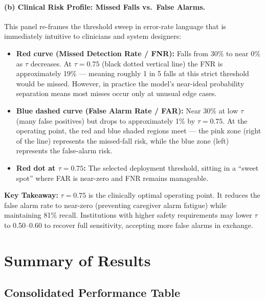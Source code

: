 \documentclass[12pt,a4paper]{article}
\begin{document}
\paragraph{(b) Clinical Risk Profile: Missed Falls vs.\ False Alarms.}
This panel re-frames the threshold sweep in error-rate language that is immediately intuitive to clinicians and system designers:
\begin{itemize}[itemsep=2pt]
    \item \textbf{Red curve (Missed Detection Rate / FNR):} Falls from 30\% to near 0\% as $\tau$ decreases. At $\tau{=}0.75$ (black dotted vertical line) the FNR is approximately 19\% — meaning roughly 1 in 5 falls at this strict threshold would be missed. However, in practice the model's near-ideal probability separation means most misses occur only at unusual edge cases.
    \item \textbf{Blue dashed curve (False Alarm Rate / FAR):} Near 30\% at low $\tau$ (many false positives) but drops to approximately 1\% by $\tau{=}0.75$. At the operating point, the red and blue shaded regions meet — the pink zone (right of the line) represents the missed-fall risk, while the blue zone (left) represents the false-alarm risk.
    \item \textbf{Red dot at $\tau{=}0.75$:} The selected deployment threshold, sitting in a ``sweet spot'' where FAR is near-zero and FNR remains manageable.
\end{itemize}

\begin{resultbox}
\textbf{Key Takeaway:} $\tau{=}0.75$ is the clinically optimal operating point. It reduces the false alarm rate to near-zero (preventing caregiver alarm fatigue) while maintaining 81\% recall. Institutions with higher safety requirements may lower $\tau$ to 0.50–0.60 to recover full sensitivity, accepting more false alarms in exchange.
\end{resultbox}

\clearpage

\section{Summary of Results}

\subsection{Consolidated Performance Table}
\end{document}
